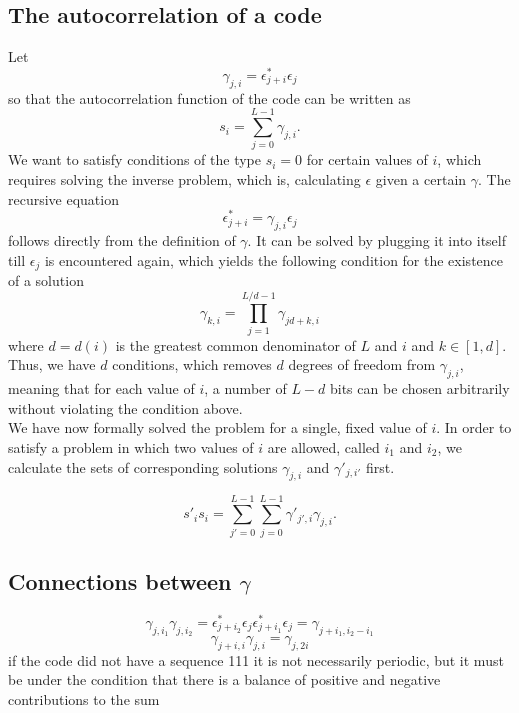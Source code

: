 \documentclass[18pt,a4paper]{extarticle}
\begin{document}
\subsection{The autocorrelation of a code}

Let
\begin{equation}
\gamma_{j, i} = \epsilon_{j + i}^*\epsilon_{j}
\end{equation}
so that the autocorrelation function of the code can be written as
\begin{equation}
s_i = \sum_{j=0}^{L-1}\gamma_{j, i}.
\end{equation}
We want to satisfy conditions of the type $s_i=0$ for certain values of $i$, which requires solving the inverse problem, which is, calculating $\epsilon$ given a certain $\gamma$.
The recursive equation
\begin{equation}
\epsilon_{j + i}^* = \gamma_{j, i} \epsilon_{j}
\end{equation}
follows directly from the definition of $\gamma$.
It can be solved by plugging it into itself till $\epsilon_j$ is encountered again, which yields the following condition for the existence of a solution
\begin{equation}
\gamma_{k, i} = \prod_{j=1}^{L/d - 1}\gamma_{jd + k, i}
\end{equation}
where $d=d(i)$ is the greatest common denominator of $L$ and $i$ and $k \in [1, d]$.
Thus, we have $d$ conditions, which removes $d$ degrees of freedom from $\gamma_{j, i}$, meaning that for each value of $i$, a number of $L-d$ bits can be chosen arbitrarily without violating the condition above.\\
We have now formally solved the problem for a single, fixed value of $i$.
In order to satisfy a problem in which two values of $i$ are allowed, called $i_1$ and $i_2$, we calculate the sets of corresponding solutions $\gamma_{j, i}$ and $\gamma'_{j, i'}$ first.

\begin{equation}
s'_i s_i = \sum_{j'=0}^{L-1}\sum_{j=0}^{L-1}\gamma'_{j', i}\gamma_{j, i}.
\end{equation}

\subsection{Connections between $\gamma$}
\begin{equation}
\gamma_{j, i_1}\gamma_{j, i_2} = \epsilon_{j + i_2}^*\epsilon_{j}\epsilon_{j + i_1}^*\epsilon_{j} = \gamma_{j+i_1, i_2-i_1}
\end{equation}
\begin{equation}
\gamma_{j+i, i}\gamma_{j, i}=\gamma_{j, 2i}
\end{equation}
\newpage
if the code did not have a sequence 111 it is not necessarily periodic, but it must be under the condition that there is a balance of positive and negative contributions to the sum
\end{document}
